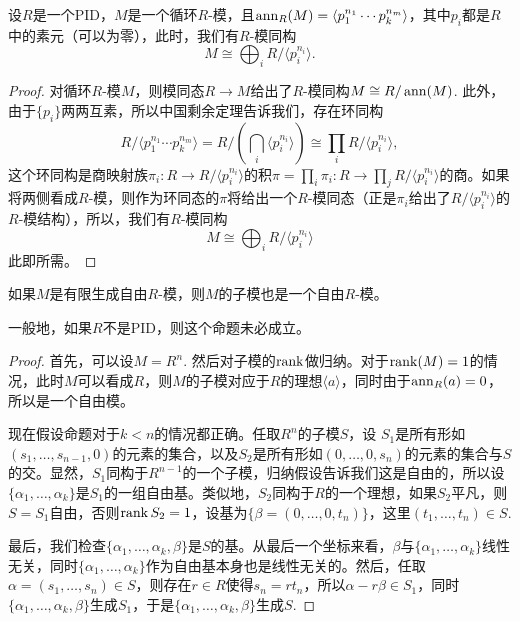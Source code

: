 \begin{pro}
    设$R$是一个PID，$M$是一个循环$R$-模，且$\operatorname{ann}_R(M)=\langle p_1^{n_1}\cdots p_k^{n_m}\rangle$，其中$p_i$都是$R$中的素元（可以为零），此时，我们有$R$-模同构
    \[
        M\cong \bigoplus_i R/\langle p_i^{n_i}\rangle.
    \]
\end{pro}

\begin{proof}
    对循环$R$-模$M$，则模同态$R\to M$给出了$R$-模同构$M\cong R/\operatorname{ann}(M)$. 此外，由于$\{p_i\}$两两互素，所以中国剩余定理告诉我们，存在环同构
    \[
        R/\langle p_1^{n_1}\cdots p_k^{n_m}\rangle = R/\left(\bigcap_i \langle p_i^{n_i}\rangle\right)\cong \prod_i R/\langle p_i^{n_i}\rangle,
    \]
    这个环同构是商映射族$\pi_i:R\to R/\langle p_i^{n_i}\rangle$的积$\pi=\prod_i \pi_i:R\to \prod_j R/\langle p_i^{n_i}\rangle$的商。如果将两侧看成$R$-模，则作为环同态的$\pi$将给出一个$R$-模同态（正是$\pi_i$给出了$R/\langle p_i^{n_i}\rangle$的$R$-模结构），所以，我们有$R$-模同构
    \[
        M\cong \bigoplus_i R/\langle p_i^{n_i}\rangle
    \]
    此即所需。
\end{proof}

\begin{pro}
	如果$M$是有限生成自由$R$-模，则$M$的子模也是一个自由$R$-模。
\end{pro}

一般地，如果$R$不是PID，则这个命题未必成立。

\begin{proof}
	首先，可以设$M=R^n$. 然后对子模的$\operatorname{rank}$做归纳。对于$\operatorname{rank}(M)=1$的情况，此时$M$可以看成$R$，则$M$的子模对应于$R$的理想$\langle a\rangle$，同时由于$\operatorname{ann}_R (a)=0$，所以是一个自由模。

	现在假设命题对于$k<n$的情况都正确。任取$R^n$的子模$S$，设 $S_1$是所有形如$(s_1,\dots,s_{n-1},0)$的元素的集合，以及$S_2$是所有形如$(0,\dots,0,s_n)$的元素的集合与$S$的交。显然，$S_1$同构于$R^{n-1}$的一个子模，归纳假设告诉我们这是自由的，所以设$\{\alpha_1,\dots,\alpha_k\}$是$S_1$的一组自由基。类似地，$S_2$同构于$R$的一个理想，如果$S_2$平凡，则$S=S_1$自由，否则$\operatorname{rank} S_2=1$，设基为$\{\beta=(0,\dots,0,t_n)\}$，这里$(t_1,\dots,t_n)\in S$. 

	最后，我们检查$\{\alpha_1,\dots,\alpha_k,\beta\}$是$S$的基。从最后一个坐标来看，$\beta$与$\{\alpha_1,\dots,\alpha_k\}$线性无关，同时$\{\alpha_1,\dots,\alpha_k\}$作为自由基本身也是线性无关的。然后，任取$\alpha=(s_1,\dots,s_n)\in S$，则存在$r\in R$使得$s_n=rt_n$，所以$\alpha-r\beta\in S_1$，同时$\{\alpha_1,\dots,\alpha_k,\beta\}$生成$S_1$，于是$\{\alpha_1,\dots,\alpha_k,\beta\}$生成$S$.
\end{proof}

